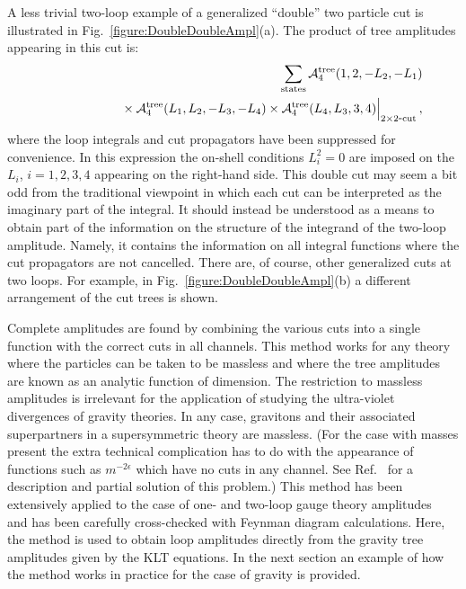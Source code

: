 A less trivial two-loop example of a generalized ``double'' two particle
cut is illustrated in Fig.~\ref{figure:DoubleDoubleAmpl}(a).
The product of tree amplitudes appearing in this cut is:
%
\begin{eqnarray}
&&
\sum_{\rm states} {\cal A}_4^{\rm tree}(1,2, -L_2, -L_1)  \nonumber \\
&& \hskip 1.8 cm 
\null \times {\cal A}_4^{\rm tree}(L_1, L_2, -L_3, -L_4)
\null \times {\cal A}_4^{\rm tree}(L_4, L_3, 3, 4) 
 \Bigr|_{\rm 2\times2\hbox{\small -} cut} \,, 
\label{DoubleDoubleCut}
\end{eqnarray}
%
where the loop integrals and cut propagators have been suppressed for
convenience.  In this expression the on-shell conditions
$L_i^2 = 0$ are imposed on the $L_i$, $i=1,2,3,4$ appearing on the
right-hand side. This double cut
may seem a bit odd from the traditional viewpoint in which each 
cut can be interpreted as the imaginary part of the integral.
It should instead be understood as a means to obtain part
of the information on the structure of the integrand of the two-loop
amplitude.  Namely, it contains the information on all integral
functions where the cut propagators are not cancelled. 
 There are, of
course, other generalized cuts at two loops.  For example, in
Fig.~\ref{figure:DoubleDoubleAmpl}(b) a different arrangement of the
cut trees is shown.

Complete amplitudes are found by combining the various cuts into a
single function with the correct cuts in all channels.  This method
works for any theory where the particles can be taken to be
massless and where the tree amplitudes are known as an analytic
function of dimension.  The restriction to massless amplitudes is
irrelevant for the application of studying the ultra-violet
divergences of gravity theories.  In any case, gravitons and their
associated superpartners in a supersymmetric theory are massless.
(For the case with masses present the extra technical complication has
to do with the appearance of functions such as $m^{-2\epsilon}$ which
have no cuts in any channel. See Ref.~\cite{BernMorgan} for a
description and partial solution of this problem.)  This method has been
extensively applied to the case of one- and two-loop gauge theory
amplitudes~\cite{Bern94SusyFour,Bern95SusyFour,Review,Bern00QCDApplications,
Bern02QCDApplications} and has been carefully cross-checked with Feynman
diagram calculations.  Here, the method is used to obtain loop
amplitudes directly from the gravity tree amplitudes given by the KLT
equations.  In the next section an example of how the method works in
practice for the case of gravity is provided.


